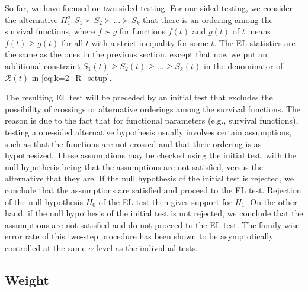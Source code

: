 So far, we have focused on two-sided testing. For one-sided testing, we consider the alternative $H^{o}_1 \colon S_1 \succ  S_2 \succ \ldots \succ S_k$ that there is an ordering among the survival functions, where $f \succ g$ for functions $f(t)$
and $g(t)$ of $t$ means $f(t) \ge g(t)$ for all $t$ with a strict inequality for some $t$. The EL statistics are the same as the ones in the previous section, except that now we put an additional constraint $S_1(t) \ge S_2(t)\ge \ldots \ge S_k(t)$ in the denominator of $\mathcal{R}(t)$ in \eqref{eq:k=2_R_setup}.

The resulting EL test will be preceded by an initial test that excludes the possibility of crossings or alternative orderings among the survival functions. The reason is due to the fact that for functional parameters (e.g., survival functions), testing a one-sided alternative hypothesis  usually involves certain assumptions, such as that the functions are not crossed and that their ordering is as hypothesized. %
These assumptions may be checked using the initial test, with the null hypothesis being that the assumptions are not satisfied, versus the alternative that they are. %
If the null hypothesis of the initial test is rejected, we conclude that the assumptions are satisfied and proceed to the EL test. Rejection of the null hypothesis $H_0$ of the EL test then gives support for $H_1$. 
On the other hand, if the null hypothesis of the initial test is not rejected, we conclude that the assumptions are not satisfied and do not proceed to the EL test. 
The family-wise error rate of this two-step procedure has been shown to be asymptotically controlled at the same $\alpha$-level as the individual tests. 
 
\subsection{Weight} \label{sec:wt} 

